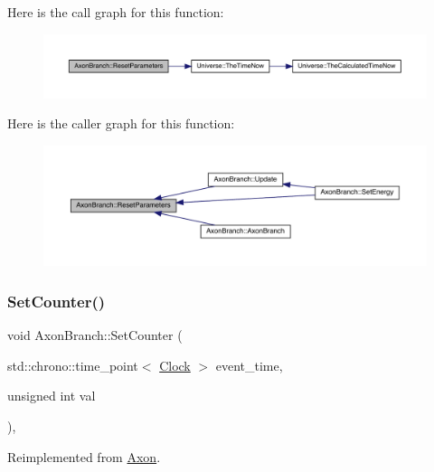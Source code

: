 Here is the call graph for this function\+:
\nopagebreak
\begin{figure}[H]
\begin{center}
\leavevmode
\includegraphics[width=350pt]{class_axon_branch_a195d68dffd37317db3f94e1b4c8f73c7_cgraph}
\end{center}
\end{figure}
Here is the caller graph for this function\+:
\nopagebreak
\begin{figure}[H]
\begin{center}
\leavevmode
\includegraphics[width=350pt]{class_axon_branch_a195d68dffd37317db3f94e1b4c8f73c7_icgraph}
\end{center}
\end{figure}
\mbox{\label{class_axon_branch_a96ba30b18627563d637d4e02fac943be}} 
\subsubsection{\texorpdfstring{Set\+Counter()}{SetCounter()}}
{\footnotesize\ttfamily void Axon\+Branch\+::\+Set\+Counter (\begin{DoxyParamCaption}\item[{std\+::chrono\+::time\+\_\+point$<$ \hyperlink{universe_8h_a0ef8d951d1ca5ab3cfaf7ab4c7a6fd80}{Clock} $>$}]{event\+\_\+time,  }\item[{unsigned int}]{val }\end{DoxyParamCaption})\hspace{0.3cm}{\ttfamily [inline]}, {\ttfamily [virtual]}}



Reimplemented from \hyperlink{class_axon_a3493cb97bde26bd66facc6084cd5f219}{Axon}.



